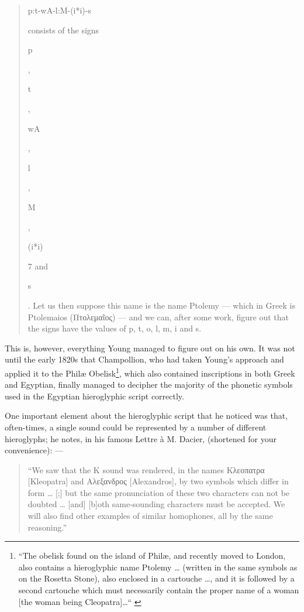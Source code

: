 \documentclass[a5paper,twoside,11pt]{report}
\begin{document}
	\begin{quote}
		\begin{hieroglyph}p:t-wA-l:M-(i*i)-s\end{hieroglyph} consists of the signs \begin{hieroglyph}p\end{hieroglyph}, \begin{hieroglyph}t\end{hieroglyph}, \begin{hieroglyph}wA\end{hieroglyph}, \begin{hieroglyph}l\end{hieroglyph}, \begin{hieroglyph}M\end{hieroglyph}, \begin{hieroglyph}(i*i)\end{hieroglyph}7 and \begin{hieroglyph}s\end{hieroglyph}. Let us then suppose this name is the name Ptolemy — which in Greek is Ptolemaios (Πτολεμαῖος) — and we can, after some work, figure out that the signs have the values of p, t, o, l, m, i and s.
	\end{quote}

	This is, however, everything Young managed to figure out on his own. It was not until the early 1820s that Champollion, who had taken Young’s approach and applied it to the Philæ Obelisk\footnote{“The obelisk found on the island of Philæ, and recently moved to London, also contains a hieroglyphic name Ptolemy … (written in the same symbols as on the Rosetta Stone), also enclosed in a cartouche …, and it is followed by a second cartouche which must necessarily contain the proper name of a woman [the woman being Cleopatra]…“ \parencite[p. 3]{lettre}}, which also contained inscriptions in both Greek and Egyptian, finally managed to decipher the majority of the phonetic symbols used in the Egyptian hieroglyphic script correctly.

	One important element about the hieroglyphic script that he noticed was that, often-times, a single sound could be represented by a number of different hieroglyphs; he notes, in his famous Lettre à M. Dacier, (shortened for your convenience): —

	\begin{quote}
		“We saw that the K sound was rendered, in the names Κλεοπατρα [Kleopatra] and Aλεξανδρος [Alexandros], by two symbols which differ in form … [;] but the same pronunciation of these two characters can not be doubted … [and] [b]oth same-sounding characters must be accepted. We will also find other examples of similar homophones, all by the same reasoning.” \parencite[p. 5]{lettre}
	\end{quote}
\end{document}
